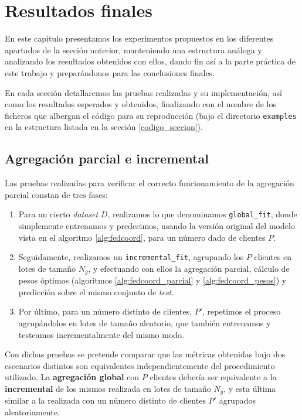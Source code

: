 \documentclass[00-Trabajo_Final.tex]{subfiles}
\begin{document}
\newpage

\section{Resultados finales} \label{sec:resultados_final_anex}
En este capítulo presentamos los experimentos propuestos en los diferentes apartados de la sección anterior, manteniendo una estructura análoga y analizando los resultados obtenidos con ellos, dando fin así a la parte práctica de este trabajo y preparándonos para las conclusiones finales.

En cada sección detallaremos las pruebas realizadas y su implementación, así como los resultados esperados y obtenidos, finalizando con el nombre de los ficheros que albergan el código para su reproducción (bajo el directorio \verb|examples| en la estructura listada en la sección \ref{codigo_seccion}).

\subsection{Agregación parcial e incremental}
Las pruebas realizadas para verificar el correcto funcionamiento de la agregación parcial constan de tres fases:

\begin{enumerate}[topsep=2pt]
    \item Para un cierto \textit{dataset} $D$, realizamos lo que denominamos \verb|global_fit|, donde simplemente entrenamos y predecimos, usando la versión original del modelo vista en el algoritmo \ref{alg:fedcoord}, para un número dado de clientes $P$.
    \item Seguidamente, realizamos un \verb|incremental_fit|, agrupando los $P$ clientes en lotes de tamaño $N_g$, y efectuando con ellos la agregación parcial, cálculo de pesos óptimos (algoritmos \ref{alg:fedcoord_parcial} y \ref{alg:fedcoord_pesos}) y predicción sobre el mismo conjunto de \textit{test}.
    \item Por último, para un número distinto de clientes, $P'$, repetimos el proceso agrupándolos en lotes de tamaño aleatorio, que también entrenamos y testeamos incrementalmente del mismo modo.
\end{enumerate}

Con dichas pruebas se pretende comparar que las métricas obtenidas bajo dos escenarios distintos son equivalentes independientemente del procedimiento utilizado. La \textbf{agregación global} con $P$ clientes debería ser equivalente a la \textbf{incremental} de los mismos realizada en lotes de tamaño $N_g$, y esta última similar a la realizada con un número distinto de clientes $P'$ agrupados aleatoriamente.
\end{document}
